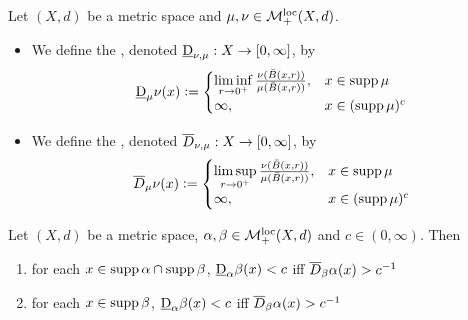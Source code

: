 \documentclass{book}
\begin{document}
	\begin{defn} 
		Let $(X, d)$ be a metric space and $\mu, \nu \in \mathcal{M}_+^{\text{loc}}(X, d)$. 
		\begin{itemize}
			\item We define the , denoted $\underbar{D}_{\nu, \mu}: X \rightarrow [0,\infty]$, by
			\[
			\underbar{D}_{\mu}\nu(x) \vcentcolon=
			\begin{cases}
				\liminf\limits_{r \rightarrow 0^+} \frac{\nu(\bar{B}(x, r))}{\mu(\bar{B}(x, r))}, & x \in \operatorname{supp} \mu \\
				\infty, & x \in (\operatorname{supp} \mu)^c  
			\end{cases}
			\]
			\item We define the , denoted $\overline{D}_{\nu, \mu}: X \rightarrow [0,\infty]$, by 
			\[
			\overline{D}_{\mu}\nu(x) \vcentcolon=
			\begin{cases}
				\limsup\limits_{r \rightarrow 0^+} \frac{\nu(\bar{B}(x, r))}{\mu(\bar{B}(x, r))}, & x \in \operatorname{supp} \mu \\
				\infty, & x \in (\operatorname{supp} \mu)^c    
			\end{cases}
			\]
		\end{itemize}
	\end{defn}

	\begin{ex} 
		Let $(X, d)$ be a metric space, $\alpha, \beta \in \mathcal{M}_+^{\text{loc}}(X, d)$ and $c \in (0,\infty)$. Then 
		\begin{enumerate}
			\item for each $x \in \operatorname{supp} \alpha \cap \operatorname{supp} \beta$, $\underbar{D}_{\alpha} \beta (x) < c$ iff $\overline{D}_{\beta}\alpha(x) > c^{-1}$
			\item for each $x \in \operatorname{supp} \beta$, $\underbar{D}_{\alpha} \beta (x) < c$ iff $\overline{D}_{\beta}\alpha(x) > c^{-1}$
		\end{enumerate} 
	\end{ex}
\end{document}
